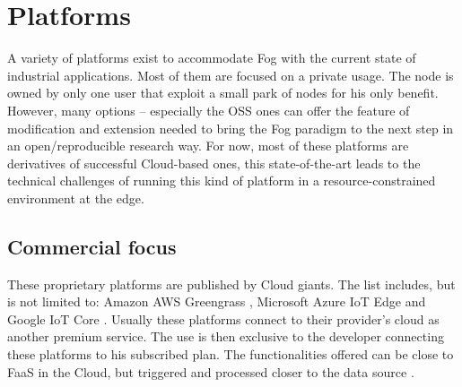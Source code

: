 \documentclass[11pt]{sdm}
\begin{document}
\section{Platforms}
\label{sec:platforms}

A variety of platforms exist to accommodate Fog with the current state of industrial applications. Most of them are focused on a private usage. The node is owned by only one user that exploit a small park of nodes for his only benefit. However, many options -- especially the \gls{OSS} ones can offer the feature of modification and extension needed to bring the Fog paradigm to the next step in an open/reproducible research way. For now, most of these platforms are derivatives of successful Cloud-based ones, this state-of-the-art leads to the technical challenges of running this kind of platform in a resource-constrained environment at the edge.



\subsection{Commercial focus}

These proprietary platforms are published by Cloud giants. The list includes, but is not limited to: Amazon AWS Greengrass \cite{noauthor_aws_nodate}, Microsoft Azure IoT Edge \cite{noauthor_iot_nodate} and Google IoT Core \cite{noauthor_cloud_nodate}. Usually these platforms connect to their provider's cloud as another premium service. The use is then exclusive to the developer connecting these platforms to his subscribed plan. The functionalities offered can be close to \gls{FaaS} in the Cloud, but triggered and processed closer to the data source \cite{elgamal_costless_2018}.
\end{document}
